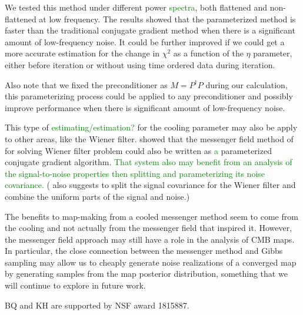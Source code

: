 \documentclass[twocolumn,linenumbers]{aastex631}
\newcommand{\Pdagger}{P^{\dagger}}
\newcommand{\textgreen}[1]{\textcolor{green}{#1}}
\begin{document}
We tested this method under different power \textgreen{spectra}, both flattened and non-flattened at low frequency.
The results showed that the parameterized method is faster than the traditional conjugate gradient method 
when there is a significant amount of low-frequency noise.
It could be further improved if we could get a more accurate estimation for the change in $\chi^2$ as a function of the $\eta$ parameter, either before iteration or without using time ordered data during iteration.

Also note that we fixed the preconditioner as $M = \Pdagger P$ during our calculation,
this parameterizing process could be applied to any preconditioner and possibly improve performance when 
there is significant amount of low-frequency noise.

This type of \textgreen{estimating/estimation?} for the cooling parameter may also be apply to other areas, like the Wiener filter.
\citet{2018A&A...620A..59P} showed that the messenger field method of \citet{2013A&A...549A.111E} for solving Wiener filter problem  could also be written as \textgreen{a} parameterized conjugate gradient algorithm.
\textgreen{
That system also may benefit from an analysis of the signal-to-noise properties then splitting and parameterizing its noise covariance.
}
(\citet{2017MNRAS.468.1782K} also suggests to split the signal covariance for the Wiener filter and combine the uniform parts of the signal and noise.)

The benefits to map-making from a cooled messenger method seem to come from the cooling and not actually from the messenger field that inspired it.  However, the messenger field approach may still have a role in the analysis of CMB maps.  In particular, the close connection between the messenger method and Gibbs sampling may allow us to cheaply generate noise realizations of a converged map by generating samples from the map posterior distribution, something that we will continue to explore in future work.












\begin{acknowledgments}
BQ and KH are supported by NSF award 1815887.
\end{acknowledgments}
\end{document}
